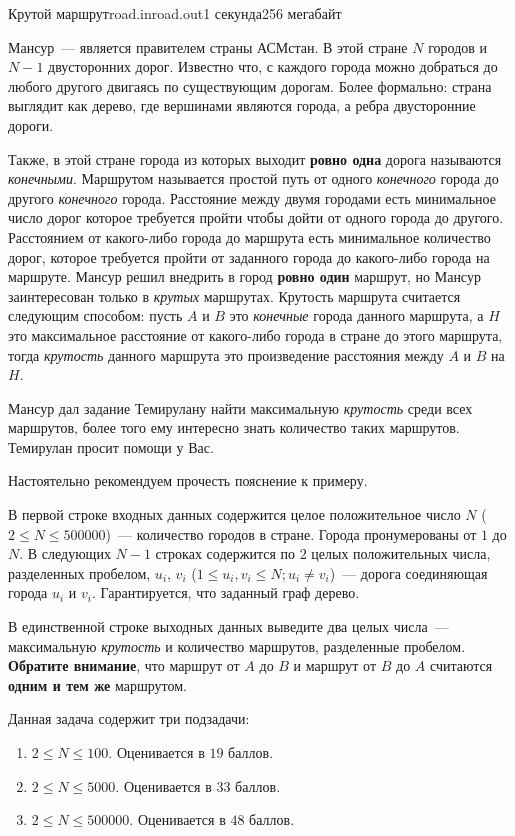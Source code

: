 \begin{problem}{Крутой маршрут}{road.in}{road.out}{1 секунда}{256 мегабайт}

Мансур~--- является правителем страны АСМстан. В этой стране $N$ городов и $N-1$ двусторонних дорог. Известно что, с каждого города можно добраться до любого другого двигаясь по существующим дорогам. Более формально: страна выглядит как дерево, где вершинами являются города, а ребра двусторонние дороги.

Также, в этой стране города из которых выходит \textbf{ровно одна} дорога называются \textit{конечными}. Маршрутом называется простой путь от одного \textit{конечного} города до другого \textit{конечного} города. Расстояние между двумя городами есть минимальное число дорог которое требуется пройти чтобы дойти от одного города до другого. Расстоянием от какого-либо города до маршрута есть минимальное количество дорог, которое требуется пройти от заданного города до какого-либо города на маршруте. Мансур решил внедрить в город \textbf{ровно один} маршрут, но Мансур заинтересован только в \textit{крутых} маршрутах. Крутость маршрута считается следующим способом: пусть $A$ и $B$ это \textit{конечные} города данного маршрута, а $H$ это максимальное расстояние от какого-либо города в стране до этого маршрута, тогда \textit{крутость} данного маршрута это произведение расстояния между $A$ и $B$ на $H$.

Мансур дал задание Темирулану найти максимальную \textit{крутость} среди всех маршрутов, более того ему интересно знать количество таких маршрутов. Темирулан просит помощи у Вас. 

Настоятельно рекомендуем прочесть пояснение к примеру.

\InputFile
В первой строке входных данных содержится целое положительное число $N$ ($2 \le N \le 500000$)~--- количество городов в стране. Города пронумерованы от $1$ до $N$. В следующих $N-1$ строках содержится по $2$ целых положительных числа, разделенных пробелом, $u_i$, $v_i$ ($1 \le u_i, v_i \le N; u_i \neq v_i$)~--- дорога соединяющая города $u_i$ и $v_i$. Гарантируется, что заданный граф дерево.

\OutputFile
В единственной строке выходных данных выведите два целых числа~--- максимальную \textit{крутость} и количество маршрутов, разделенные пробелом. \textbf{Обратите внимание}, что маршрут от $A$ до $B$ и маршрут от $B$ до $A$ считаются \textbf{одним и тем же} маршрутом.

\Scoring
Данная задача содержит три подзадачи:
\begin{enumerate}
\item $2 \le N \le 100$. Оценивается в $19$ баллов.
\item $2 \le N \le 5000$. Оценивается в $33$ баллов.
\item $2 \le N \le 500000$. Оценивается в $48$ баллов.
\end{enumerate}


\end{problem}
